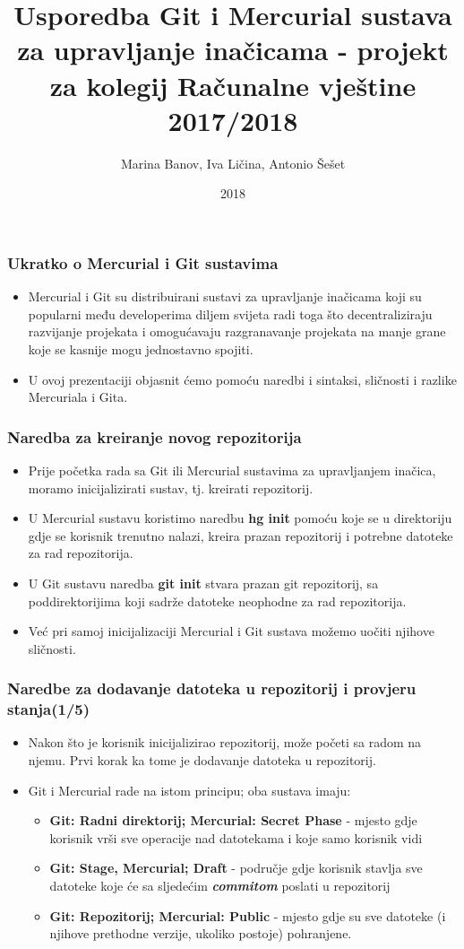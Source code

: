 \documentclass{beamer}
\title{Usporedba Git i Mercurial sustava za upravljanje inačicama - projekt za kolegij Računalne vještine 2017/2018}
\author{Marina Banov, Iva Ličina, Antonio Šešet}
\institute{Tehnički fakultet u Rijeci}
\date{2018}
\begin{document}
 
	\frame{\titlepage}
 
	\begin{frame}
		\frametitle{Ukratko o Mercurial i Git sustavima}
		 \begin{itemize}
			\item Mercurial i Git su distribuirani sustavi za upravljanje inačicama koji su popularni među developerima diljem svijeta radi toga što decentraliziraju razvijanje projekata i omogućavaju razgranavanje projekata na manje grane koje se kasnije mogu jednostavno spojiti.
			\item U ovoj prezentaciji objasnit ćemo pomoću naredbi i sintaksi, sličnosti i razlike Mercuriala i Gita.
		\end{itemize}
	\end{frame}

	\begin{frame}
		\frametitle{Naredba za kreiranje novog  repozitorija}
		 \begin{itemize}
			  \item Prije početka rada sa Git ili Mercurial sustavima za upravljanjem inačica, moramo inicijalizirati sustav, tj. kreirati repozitorij.		
			  \item U Mercurial sustavu koristimo naredbu \textbf{hg init} pomoću koje se u direktoriju gdje se korisnik trenutno nalazi, kreira prazan repozitorij i  potrebne datoteke za rad repozitorija. 
			  \item U Git sustavu naredba \textbf{git init} stvara prazan git repozitorij, sa poddirektorijima koji sadrže datoteke neophodne za rad repozitorija.
			  \item Već pri samoj inicijalizaciji Mercurial i Git sustava možemo uočiti njihove sličnosti.
		\end{itemize}
	\end{frame}

	\begin{frame}
		\frametitle{Naredbe za dodavanje datoteka u repozitorij i provjeru stanja(1/5)}
		 \begin{itemize}
			  \item Nakon što je korisnik inicijalizirao repozitorij, može početi sa radom na njemu. Prvi korak ka tome je dodavanje datoteka u repozitorij.
			  \item Git i Mercurial rade na istom principu; oba sustava imaju:
				  \begin{itemize}
					  \item \textbf{Git: Radni direktorij; Mercurial: Secret Phase} - mjesto gdje korisnik vrši sve operacije nad datotekama i koje samo korisnik vidi
					  \item \textbf{Git: Stage, Mercurial; Draft} - područje gdje korisnik stavlja sve datoteke koje će sa sljedećim \textbf{\textit{commitom}} poslati u repozitorij
					  \item \textbf{Git: Repozitorij; Mercurial: Public} - mjesto gdje su sve datoteke (i njihove prethodne verzije, ukoliko postoje) pohranjene.
				  \end{itemize}
			
		  \end{itemize}
	\end{frame}
\end{document}
